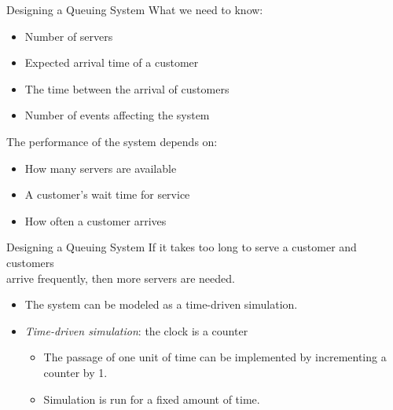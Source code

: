 \documentclass[14pt,aspectratio=1610]{beamer}
\begin{document}
\begin{frame}{Designing a Queuing System}
  What we need to know:
  \begin{itemize}
    \item 
      Number of servers
    \item 
      Expected arrival time of a customer
    \item 
      The time between the arrival of customers
    \item 
      Number of events affecting the system
  \end{itemize}

  The performance of the system depends on:
  \begin{itemize}
    \item 
      How many servers are available
    \item 
      A customer's wait time for service
    \item 
      How often a customer arrives
  \end{itemize}
\end{frame}

\begin{frame}{Designing a Queuing System}
  If it takes too long to serve a customer and customers\\ arrive frequently, then more servers are needed.

  \begin{itemize}\setlength\itemsep{0.5em}
    \item 
      The system can be modeled as a time-driven simulation.
    \item 
      \emph{Time-driven simulation}: the clock is a counter
      \begin{itemize}
        \item 
        The passage of one unit of time can be implemented by incrementing a counter by 1.
        \item 
          Simulation is run for a fixed amount of time.
      \end{itemize}
  \end{itemize}
\end{frame}
\end{document}
